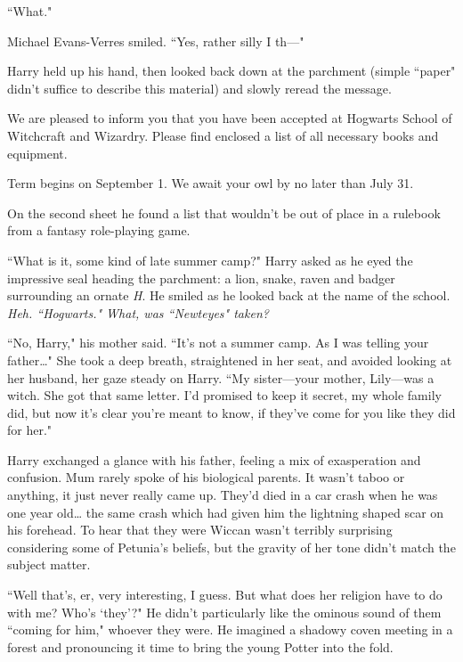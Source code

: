``What."

Michael Evans-Verres smiled. ``Yes, rather silly I th---"

Harry held up his hand, then looked back down at the
parchment (simple ``paper" didn't suffice to describe this material)
and slowly reread the message.

\begin{writtenNote}

We are pleased to inform you that you have been
accepted at Hogwarts School of Witchcraft and Wizardry.
Please find enclosed a list of all necessary books and
equipment.

Term begins on September 1. We await your owl by no
later than July 31.


\end{writtenNote}

On the second sheet he found a list that wouldn't be out
of place in a rulebook from a fantasy role-playing game.

``What is it, some kind of late summer camp?" Harry
asked as he eyed the impressive seal heading the
parchment: a lion, snake, raven and badger surrounding
an ornate \emph{H}. He smiled as he looked back at the name of
the school. \emph{Heh. ``Hogwarts." What, was ``Newteyes" taken?}

``No, Harry," his mother said. ``It's not a summer camp. As
I was telling your father{\ldots}" She took a deep breath,
straightened in her seat, and avoided looking at her
husband, her gaze steady on Harry. ``My sister---your mother,
Lily---was a witch. She got that same letter. I'd promised
to keep it secret, my whole family did, but now it's clear
you're meant to know, if they've come for you like they
did for her."

Harry exchanged a glance with his father, feeling a mix of
exasperation and confusion. Mum rarely spoke of his
biological parents. It wasn't taboo or anything, it just never
really came up. They'd died in a car crash when he was
one year old{\ldots} the same crash which had given him the
lightning shaped scar on his forehead. To hear that they
were Wiccan wasn't terribly surprising considering some of
Petunia's beliefs, but the gravity of her tone didn't match
the subject matter.

``Well that's, er, very interesting, I guess. But what does
her religion have to do with me? Who's `they'?" He didn't
particularly like the ominous sound of them ``coming for
him," whoever they were. He imagined a shadowy coven
meeting in a forest and pronouncing it time to bring the
young Potter into the fold.

